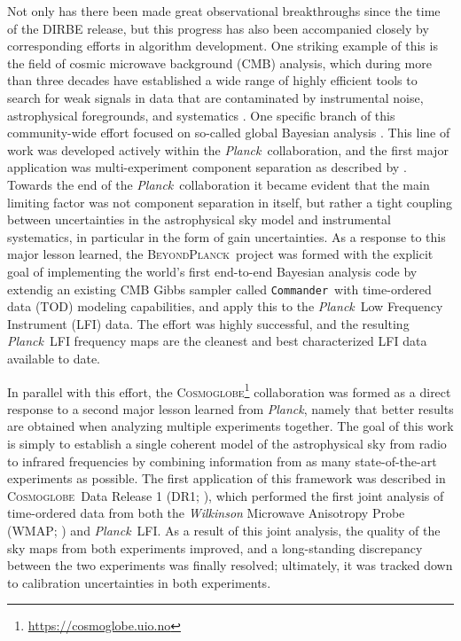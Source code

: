 \documentclass{aa}
\def\Cosmoglobe{\textsc{Cosmoglobe}}
\def\commander{\texttt{Commander}}
\def\Planck{\textit{Planck}}
\newcommand{\bp}{\textsc{BeyondPlanck}}
\newcommand{\cosmoglobe}{\textsc{Cosmoglobe}}
\begin{document}
Not only has there been made great observational breakthroughs since the time of the DIRBE release, but this progress has also been accompanied closely by corresponding efforts in algorithm development. One striking example of this is the field of cosmic microwave background (CMB) analysis, which during more than three decades have established a wide range of highly efficient tools to search for weak signals in data that are contaminated by instrumental noise, astrophysical foregrounds, and systematics \citep[e.g.,][]{bennett2012,pb2015,planck2016-l01}. One specific branch of this community-wide effort focused on so-called global Bayesian analysis \citep{jewell2004,wandelt2004}. This line of work was developed actively within the \Planck\ collaboration, and the first major application was multi-experiment component separation as described by \citet{planck2014-a12}. Towards the end of the \Planck\ collaboration it became evident that the main limiting factor was not component separation in itself, but rather a tight coupling between uncertainties in the astrophysical sky model and instrumental systematics, in particular in the form of gain uncertainties. As a response to this major lesson learned, the \bp\ project \citep{bp01} was formed with the explicit goal of implementing the world's first end-to-end Bayesian analysis code by extendig an existing CMB Gibbs sampler called \commander\ with time-ordered data (TOD) modeling capabilities, and apply this to the \Planck\ Low Frequency Instrument (LFI) data. The effort was highly successful, and the resulting \Planck\ LFI frequency maps are the cleanest and best characterized LFI data available to date.

In parallel with this effort, the \Cosmoglobe\footnote{\url{https://cosmoglobe.uio.no}} collaboration was formed as a direct response to a second major lesson learned from \Planck, namely that better results are obtained when analyzing multiple experiments together. The goal of this work is simply to establish a single coherent model of the astrophysical sky from radio to infrared frequencies by combining information from as many state-of-the-art experiments as possible. The first application of this framework was described in \cosmoglobe\ Data Release 1 (DR1; \citealp{watts2023_dr1}), which performed the first joint analysis of time-ordered data from both the \textit{Wilkinson} Microwave Anisotropy Probe (WMAP; \citealp{bennett2012}) and \Planck\ LFI. As a result of this joint analysis, the quality of the sky maps from both experiments improved, and a long-standing discrepancy between the two experiments was finally resolved; ultimately, it was tracked down to calibration uncertainties in both experiments.
\end{document}
